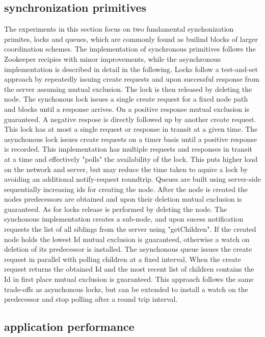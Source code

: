 \subsection{synchronization primitives}
The experiments in this section focus on two fundamental synchonization primites, locks and queues, which are commonly found as builind blocks of larger coordination schemes. The implementation of synchronous primitives follows the Zookeeper recipies with minor improvements, while the asynchronous implementation is described in detail in the following.
Locks follow a test-and-set approach by repeatedly issuing create requests and upon successful response from the server assuming mutual exclusion. The lock is then released by deleting the node. The synchonous lock issues a single create request for a fixed node path and blocks until a response arrives. On a positive response mutual exclusion is guaranteed. A negative respose is directly followed up by another create request. This lock has at most a single request or response in transit at a given time. The asynchonous lock issues create requests on a timer basis until a positive response is recorded. This implementation has multiple requests and responses in transit at a time and effectively "polls" the availability of the lock. This puts higher load on the network and server, but may reduce the time taken to aquire a lock by avoiding an additional notify-request roundtrip.
Queues are built using server-side sequentially increasing ids for creating the node. After the node is created the nodes predecessors are obtained and upon their deletion mutual exclusion is guaranteed. As for locks release is performed by deleting the node. The synchonous implementation creates a sub-node, and upon sucess notification requests the list of all siblings from the server using "getChildren". If the created node holds the lowest Id mutual exclusion is guaranteed, otherwise a watch on deletion of its predecessor is installed. The asynchonous queue issues the create request in parallel with polling children at a fixed interval. When the create request returns the obtained Id and the most recent list of children contains the Id in first place mutual exclusion is guaranteed. This approach follows the same trade-offs as asynchonous locks, but can be extended to install a watch on the predecessor and stop polling after a round trip interval.

\subsection{application performance}

